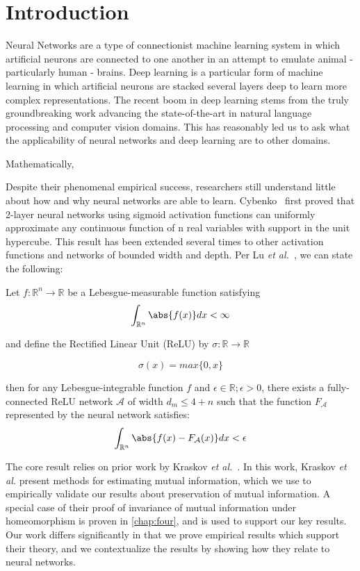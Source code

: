 \chapter{Introduction}
\label{chap:intro}


Neural Networks are a type of connectionist machine learning system in which artificial neurons are connected to one another in an attempt to emulate animal - particularly human - brains.
Deep learning is a particular form of machine learning in which artificial neurons are stacked several layers deep to learn more complex representations. 
The recent boom in deep learning stems from the truly groundbreaking work advancing the state-of-the-art in natural language processing and computer vision domains.
This has reasonably led us to ask what the applicability of neural networks and deep learning are to other domains.

Mathematically, 

Despite their phenomenal empirical success, researchers still understand little about how and why neural networks are able to learn.
Cybenko~\cite{cybenko1989approximation} first proved that 2-layer neural networks using sigmoid activation functions can uniformly approximate any continuous function of n real variables with support in the unit hypercube.
This result has been extended several times to other activation functions and networks of bounded width and depth. 
Per Lu \textit{et al.}~\cite{lu2017expressive}, we can state the following:

Let $f: \mathbb{R}^n \to \mathbb{R}$ be a Lebesgue-measurable function satisfying
$$\int_{\mathbb{R}^n} \abs{f(x)} dx < \infty$$

and define the Rectified Linear Unit (ReLU) by $\sigma: \mathbb{R} \to \mathbb{R}$ 

$$\sigma(x) = max\{0, x\}$$

then for any Lebesgue-integrable function $f$ and $\epsilon \in \mathbb{R}; \epsilon > 0$, there exists a fully-connected ReLU network $\mathcal{A}$ of width $d_m \leq 4 + n$ such that the function $F_{\mathcal{A}}$ represented by the neural network satisfies:
$$\int_{\mathbb{R}^n} \abs{f(x) - F_{\mathcal{A}}(x)}dx < \epsilon$$


The core result relies on prior work by Kraskov \textit{et al.}~\cite{kraskov2004estimating}. 
In this work, Kraskov \textit{et al.} present methods for estimating mutual information, which we use to empirically validate our results about preservation of mutual information.
A special case of their proof of invariance of mutual information under homeomorphism is proven in \ref{chap:four}, and is used to support our key results.
Our work differs significantly in that we prove empirical results which support their theory, and we contextualize the results by showing how they relate to neural networks.


